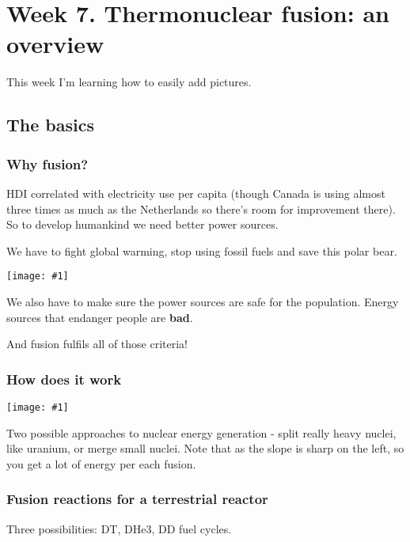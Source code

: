 \documentclass[PlasmaNotes.tex]{subfiles}
\begin{document}
\setcounter{section}{6}
\let\oldexp\exp
\renewcommand{\exp}[1]{\oldexp(#1)}
\newcommand{\png}[1]{\begin{center}\texttt{[image: \#1]}\end{center}}
\section{Week 7. Thermonuclear fusion: an overview}

This week I'm learning how to easily add pictures.

\subsection{The basics}

\subsubsection{Why fusion?}

HDI correlated with electricity use per capita (though Canada is using almost three times as much as the Netherlands so there's room for improvement there). So to develop humankind we need better power sources.

We have to fight global warming, stop using fossil fuels and save this polar bear.

\png{thisbear.PNG}

We also have to make sure the power sources are safe for the population. Energy sources that endanger people are \textbf{bad}.

And fusion fulfils all of those criteria!

\subsubsection{How does it work}

\png{bindingenergycurve.PNG}

Two possible approaches to nuclear energy generation - split really heavy nuclei, like uranium, or merge small nuclei. Note that as the slope is sharp on the left, so you get a lot of energy per each fusion.

\subsubsection{Fusion reactions for a terrestrial reactor}

Three possibilities: DT, DHe3, DD fuel cycles.
\end{document}

